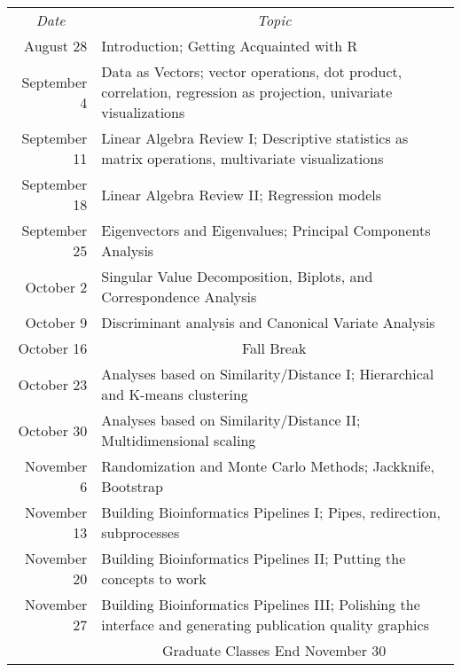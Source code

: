\documentclass[11pt,letterpaper]{article}
\begin{document}
\renewcommand{\arraystretch}{1.4}
\begin{center}
\begin{tabular}{rp{5.5in}}
\multicolumn{1}{c}{{\sl Date}} & \multicolumn{1}{c}{{\sl Topic}} \\
August 28 & Introduction; Getting Acquainted with R  \\
September 4 & Data as Vectors; vector operations, dot product, correlation, regression as projection, univariate visualizations\\
September 11 & Linear Algebra Review I; Descriptive statistics as matrix operations, multivariate visualizations \\
September 18 & Linear Algebra Review II; Regression models \\
September 25 & Eigenvectors and Eigenvalues; Principal Components Analysis \\
October 2 & Singular Value Decomposition, Biplots, and Correspondence Analysis\\
October 9 & Discriminant analysis and Canonical Variate Analysis\\
October 16 & \multicolumn{1}{c}{{\sc Fall Break}} \\
October 23 & Analyses based on Similarity/Distance I; Hierarchical and K-means clustering\\
October 30 & Analyses based on Similarity/Distance II; Multidimensional scaling\\
November 6 & Randomization and Monte Carlo Methods; Jackknife, Bootstrap\\
November 13 & Building Bioinformatics Pipelines I; Pipes, redirection, subprocesses \\
November 20 & Building Bioinformatics Pipelines II; Putting the concepts to work \\ 
November 27 & Building Bioinformatics Pipelines III; Polishing the interface and generating publication quality graphics \\ 
& \multicolumn{1}{c}{{\sc Graduate Classes End November 30}} \\
\end{tabular}
\end{center}
\end{document}
